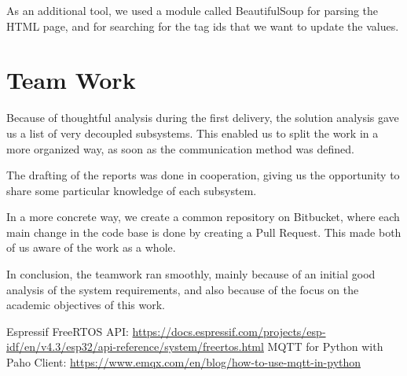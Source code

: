 \documentclass[11pt]{article}
\begin{document}
As an additional tool, we used a module called BeautifulSoup for parsing the HTML page, and for searching for the tag ids that we want to update the values.

\section{Team Work}

Because of thoughtful analysis during the first delivery, the solution analysis gave us a list of very decoupled subsystems. This enabled us to split the work in a more organized way, as soon as the communication method was defined.

The drafting of the reports was done in cooperation, giving us the opportunity to share some particular knowledge of each subsystem.

In a more concrete way, we create a common repository on Bitbucket, where each main change in the code base is done by creating a Pull Request. This made both of us aware of the work as a whole.

In conclusion, the teamwork ran smoothly, mainly because of an initial good analysis of the system requirements, and also because of the focus on the academic objectives of this work.

\newpage
\begin{thebibliography}{8}

 Espressif FreeRTOS API: {\url{https://docs.espressif.com/projects/esp-idf/en/v4.3/esp32/api-reference/system/freertos.html}}
 MQTT for Python with Paho Client: {\url{https://www.emqx.com/en/blog/how-to-use-mqtt-in-python}}

\end{thebibliography}
\end{document}
